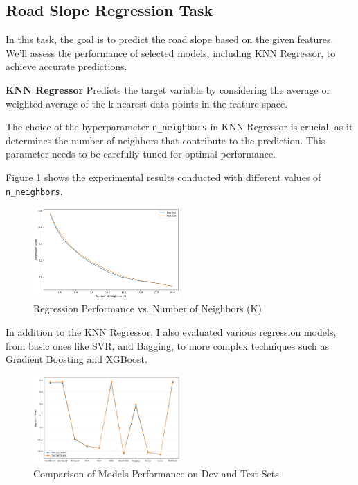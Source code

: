\documentclass[conference]{IEEEtran}
\begin{document}
\subsection{Road Slope Regression Task}
In this task, the goal is to predict the road slope based on the given features. We'll assess the performance of selected models, including KNN Regressor, to achieve accurate predictions.

\noindent \textbf{KNN Regressor} \hspace{0.2em} Predicts the target variable by considering the average or weighted average of the k-nearest data points in the feature space.

The choice of the hyperparameter \texttt{n\_neighbors} in KNN Regressor is crucial, as it determines the number of neighbors that contribute to the prediction. This parameter needs to be carefully tuned for optimal performance.

Figure \ref{fig:different_k_results} shows the experimental results conducted with different values of \texttt{n\_neighbors}.


\begin{figure}[h]
    \centering
    \includegraphics[width=0.5\textwidth]{k_regression_score.png}
    \caption{Regression Performance vs. Number of Neighbors (K)}
    \label{fig:different_k_results}
\end{figure}


In addition to the KNN Regressor, I also evaluated various regression models, from basic ones like SVR, and Bagging, to more complex techniques such as Gradient Boosting and XGBoost.


\begin{figure}[h]
    \centering
    \includegraphics[width=0.5\textwidth]{regression_score.png}
    \caption{Comparison of Models Performance on Dev and Test Sets}
    \label{fig:regression_score}
\end{figure}
\end{document}

